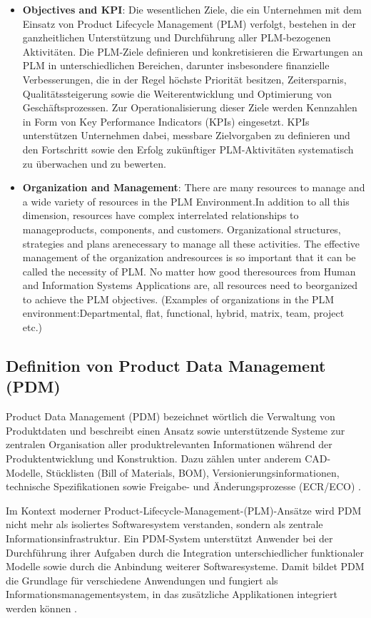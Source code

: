 \begin{itemize}
	\item \textbf{Objectives and KPI}: 
	Die wesentlichen Ziele, die ein Unternehmen mit dem Einsatz von Product Lifecycle Management (PLM) verfolgt, bestehen in der ganzheitlichen Unterstützung und Durchführung aller PLM‑bezogenen Aktivitäten. Die PLM‑Ziele definieren und konkretisieren die Erwartungen an PLM in unterschiedlichen Bereichen, darunter insbesondere finanzielle Verbesserungen, die in der Regel höchste Priorität besitzen, Zeitersparnis, Qualitätssteigerung sowie die Weiterentwicklung und Optimierung von Geschäftsprozessen.
	Zur Operationalisierung dieser Ziele werden Kennzahlen in Form von Key Performance Indicators (KPIs) eingesetzt. KPIs unterstützen Unternehmen dabei, messbare Zielvorgaben zu definieren und den Fortschritt sowie den Erfolg zukünftiger PLM‑Aktivitäten systematisch zu überwachen und zu bewerten.
	\item \textbf{Organization and Management}: There are many resources to manage and a wide variety of resources in the PLM Environment.In addition to all this dimension, resources have complex interrelated relationships to manageproducts, components, and customers. Organizational structures, strategies and plans arenecessary to manage all these activities. The effective management of the organization andresources is so important that it can be called the necessity of PLM. No matter how good theresources from Human and Information Systems Applications are, all resources need to beorganized to achieve the PLM objectives. (Examples of organizations in the PLM environment:Departmental, flat, functional, hybrid, matrix, team, project etc.) 
	
\end{itemize}
\subsection{Definition von Product Data Management (PDM)}

Product Data Management (PDM) bezeichnet wörtlich die Verwaltung von Produktdaten und beschreibt einen Ansatz sowie unterstützende Systeme zur zentralen Organisation aller produktrelevanten Informationen während der Produktentwicklung und Konstruktion. Dazu zählen unter anderem CAD-Modelle, Stücklisten (Bill of Materials, BOM), Versionierungsinformationen, technische Spezifikationen sowie Freigabe- und Änderungsprozesse (ECR/ECO) \cite{philpotts1996introduction}.

Im Kontext moderner Product-Lifecycle-Management-(PLM)-Ansätze wird PDM nicht mehr als isoliertes Softwaresystem verstanden, sondern als zentrale Informationsinfrastruktur. Ein PDM-System unterstützt Anwender bei der Durchführung ihrer Aufgaben durch die Integration unterschiedlicher funktionaler Modelle sowie durch die Anbindung weiterer Softwaresysteme. Damit bildet PDM die Grundlage für verschiedene Anwendungen und fungiert als Informationsmanagementsystem, in das zusätzliche Applikationen integriert werden können \cite{crnkovic2003implementing}.

